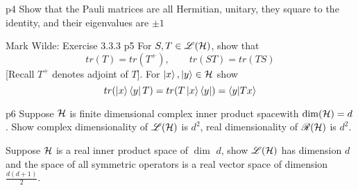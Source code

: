 \documentclass[a4paper, 11pt]{article}
\newcommand{\fdcps}{finite dimensional complex inner product space}
\begin{document}

\begin{problem}{%
	}{p4%
	}
	Show that the Pauli matrices are all Hermitian, unitary, they square to the identity, and their eigenvalues are $\pm 1$
\end{problem}


\begin{problem}{%
		Mark Wilde: Exercise 3.3.3
	}{p5%
	}
For $S,T\in {\mathscr{L}}(\mathcal{H})$, show that $$tr(T)=tr(T^+),\qquad tr(ST)=tr(TS)$$ [Recall $T^+$ denotes adjoint of $T$]. For $\ket{x},\ket{y}\in\mathcal{H}$ show $$tr(\ket{x}\bra{y}T)=tr(T\ket{x}\bra{y})=\bra{y}\ket{Tx}$$
\end{problem}


\begin{problem}{%
	}{p6%
	}
	Suppose $\mathcal{H}$ is \fdcps with $\dim(\mathcal{H})=d$. Show complex dimensionality of ${\mathscr{L}}(\mathcal{H})$ is $d^2$, real dimensionality of ${\mathscr{R}}(\mathcal{H})$ is $d^2$.\parinn
	
	Suppose $\mathcal{H}$ is a real inner product space of $\dim$ $d$, show ${\mathscr{L}}(\mathcal{H})$ has dimension $d$ and  the space of all symmetric operators  is a real vector space of dimension $\frac{d(d+1)}{2}$.
\end{problem}

\end{document}
